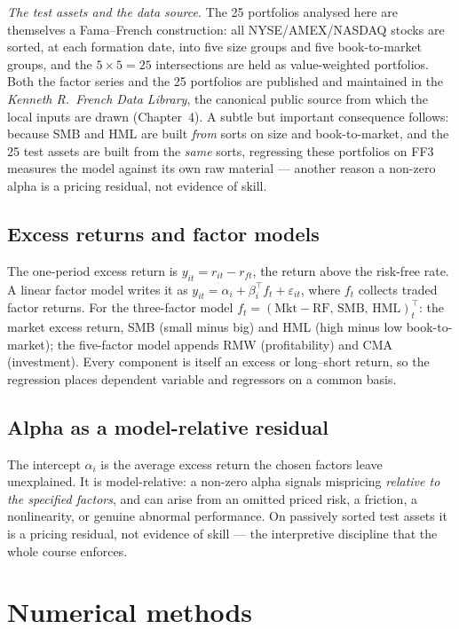\emph{The test assets and the data source.} The 25 portfolios analysed
here are themselves a Fama--French construction: all NYSE/AMEX/NASDAQ
stocks are sorted, at each formation date, into five size groups and five
book-to-market groups, and the $5\times5=25$ intersections are held as
value-weighted portfolios. Both the factor series and the 25 portfolios
are published and maintained in the \emph{Kenneth R.\ French Data Library},
the canonical public source from which the local inputs are drawn
(Chapter~4). A subtle but important consequence follows: because SMB and
HML are built \emph{from} sorts on size and book-to-market, and the 25 test
assets are built from the \emph{same} sorts, regressing these portfolios on
FF3 measures the model against its own raw material --- another reason a
non-zero alpha is a pricing residual, not evidence of skill.

\subsection{Excess returns and factor models}

The one-period excess return is $y_{it}=r_{it}-r_{ft}$, the return above
the risk-free rate. A linear factor model writes it as
$y_{it}=\alpha_i+\beta_i^{\top}f_t+\varepsilon_{it}$, where $f_t$ collects
traded factor returns. For the three-factor model
$f_t=(\text{Mkt}-\text{RF},\,\text{SMB},\,\text{HML})_t^{\top}$: the market
excess return, SMB (small minus big) and HML (high minus low
book-to-market); the five-factor model appends RMW (profitability) and
CMA (investment). Every component is itself an excess or long--short return,
so the regression places dependent variable and regressors on a common
basis.

\subsection{Alpha as a model-relative residual}

The intercept $\alpha_i$ is the average excess return the chosen factors
leave unexplained. It is model-relative: a non-zero alpha signals mispricing
\emph{relative to the specified factors}, and can arise from an omitted
priced risk, a friction, a nonlinearity, or genuine abnormal performance.
On passively sorted test assets it is a pricing residual, not evidence of
skill --- the interpretive discipline that the whole course enforces.

\section{Numerical methods}\label{prelim-num}

